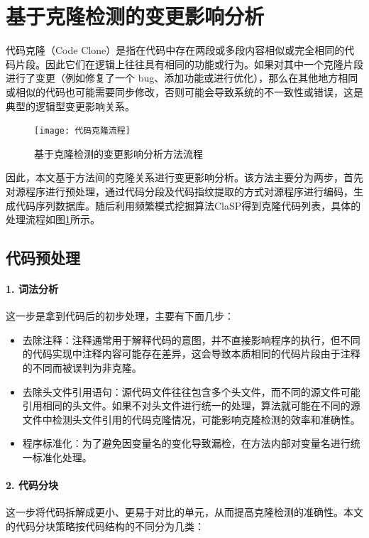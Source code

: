 \section{基于克隆检测的变更影响分析}
代码克隆（Code Clone）是指在代码中存在两段或多段内容相似或完全相同的代码片段。因此它们在逻辑上往往具有相同的功能或行为。如果对其中一个克隆片段进行了变更（例如修复了一个 bug、添加功能或进行优化），那么在其他地方相同或相似的代码也可能需要同步修改，否则可能会导致系统的不一致性或错误，这是典型的逻辑型变更影响关系。

\begin{figure}[htbp]
\centering
\texttt{[image: 代码克隆流程]}
\caption{基于克隆检测的变更影响分析方法流程}
\label{1_基于代码克隆的变更影响分析方法流程}
\end{figure}

因此，本文基于方法间的克隆关系进行变更影响分析。该方法主要分为两步，首先对源程序进行预处理，通过代码分段及代码指纹提取的方式对源程序进行编码，生成代码序列数据库。随后利用频繁模式挖掘算法ClaSP得到克隆代码列表，具体的处理流程如图\ref{1_基于代码克隆的变更影响分析方法流程}所示。



\subsection{代码预处理}

\paragraph{1. 词法分析} 这一步是拿到代码后的初步处理，主要有下面几步：

\begin{itemize}
    \item 去除注释：注释通常用于解释代码的意图，并不直接影响程序的执行，但不同的代码实现中注释内容可能存在差异，这会导致本质相同的代码片段由于注释的不同而被误判为非克隆。
    
    \item 去除头文件引用语句：源代码文件往往包含多个头文件，而不同的源文件可能引用相同的头文件。如果不对头文件进行统一的处理，算法就可能在不同的源文件中检测头文件引用的代码克隆情况，可能影响克隆检测的效率和准确性。
    
    \item 程序标准化：为了避免因变量名的变化导致漏检，在方法内部对变量名进行统一标准化处理。

\end{itemize}


\paragraph{2. 代码分块} 这一步将代码拆解成更小、更易于对比的单元，从而提高克隆检测的准确性。本文的代码分块策略按代码结构的不同分为几类：

